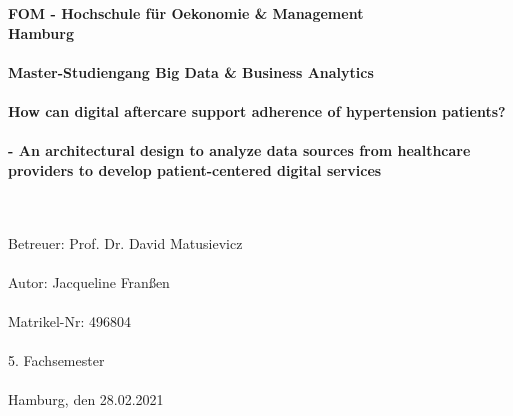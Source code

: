 		\begin{titlepage}
			\begin{center}
			\renewcommand{\baselinestretch}{1.5}
					\textbf{\large FOM - Hochschule für Oekonomie \& Management \\
						Hamburg \\
						\ \\
						Master-Studiengang Big Data \& Business Analytics \\
						\ \\
                        How can digital aftercare support adherence of hypertension patients? \ \\
						- An architectural design to analyze data sources from healthcare providers 
						 to develop patient-centered digital services \ \\
						\ \\
						}
						
					\textrm{
						\ \\
						Betreuer: Prof. Dr. David Matusievicz \\
						\ \\
						Autor: Jacqueline Franßen \\
						\ \\
						Matrikel-Nr: 496804 \\
						\ \\
						5. Fachsemester \\
						\ \\
						Hamburg, den 28.02.2021 \\
						}
			\end{center}
		\end{titlepage}

%

			\setcounter{tocdepth}{3}
			\setcounter{secnumdepth}{3}		
			\thispagestyle{empty}
			\tableofcontents
			\newpage
			\listoffigures
			\listoftables

			\thispagestyle{empty}
